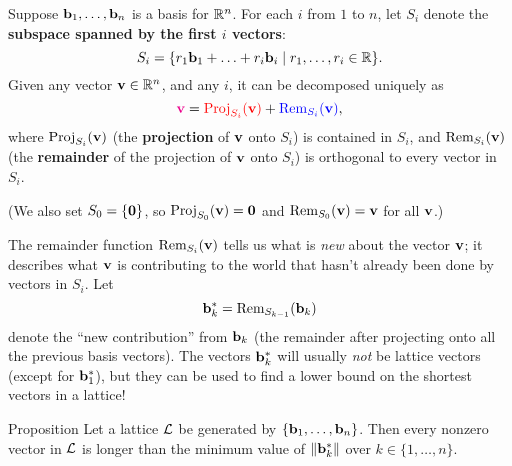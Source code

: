 \begin{defns}
	Suppose $\mathbf{b}_1,\ldots,\mathbf{b}_n$ is a basis for $\mathbb{R}^n$. For each $i$ from $1$ to $n$, let $S_i$ denote the \textbf{subspace spanned by the first $i$ vectors}:
	\[S_i=\{r_1\mathbf{b}_1+\ldots+r_i\mathbf{b}_i\mid r_1,\ldots,r_i\in\mathbb{R}\}.\]	
	Given any vector {\color{magenta}$\mathbf{v}\in\mathbb{R}^n$}, and any $i$, it can be decomposed uniquely as
	\[{\color{magenta}\mathbf{v}}={\color{red}\text{Proj}_{S_i}(\mathbf{v})}+{\color{blue}\text{Rem}_{S_i}(\mathbf{v})},\]
	where {\color{red}$\text{Proj}_{S_i}(\mathbf{v})$} (the {\color{red}\textbf{projection}} of $\mathbf{v}$ onto $S_i$) is contained in $S_i$, and {\color{blue}$\text{Rem}_{S_i}(\mathbf{v})$} (the  {\color{blue}\textbf{remainder}} of the projection of $\mathbf{v}$ onto $S_i$) is orthogonal to every vector in  {\color{red}$S_i$}. 
	\begin{center}
	\end{center}
	(We also set $S_0=\{\mathbf{0}\}$, so $\text{Proj}_{S_0}(\mathbf{v})=\mathbf{0}$ and $\text{Rem}_{S_0}(\mathbf{v})=\mathbf{v}$ for all $\mathbf{v}$.)
\end{defns}

The remainder function $\text{Rem}_{S_i}(\mathbf{v})$ tells us what is \emph{new} about the vector $\mathbf{v}$; it describes what $\mathbf{v}$ is contributing to the world that hasn't already been done by vectors in $S_i$. Let
\[\mathbf{b}_k^*=\text{Rem}_{S_{k-1}}(\mathbf{b}_k)\]
denote the ``new contribution'' from $\mathbf{b}_k$ (the remainder after projecting onto all the previous basis vectors). The vectors $\mathbf{b}_k^*$ will usually \emph{not} be lattice vectors (except for $\mathbf{b}_1^*$), but they can be used to find a lower bound on the shortest vectors in a lattice! 

\begin{toprove}{Proposition}\label{prop:shortvbstar}
	Let a lattice $\mathcal{L}$ be generated by $\{\mathbf{b}_1,\ldots,\mathbf{b}_n\}$. Then every nonzero vector in $\mathcal{L}$ is longer than the minimum value of $\|\mathbf{b}_k^*\|$ over $k\in\{1,\ldots,n\}$.
\end{toprove}

